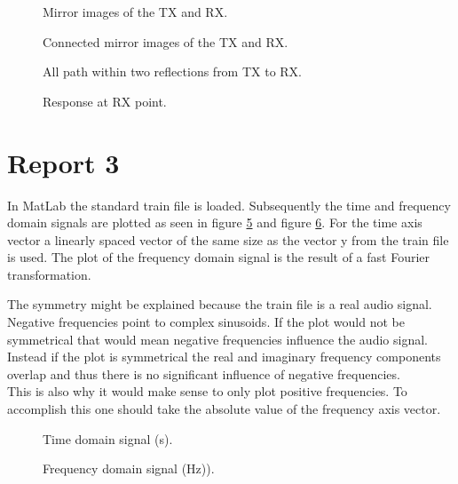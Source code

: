 \documentclass[final]{scrreprt} %
\begin{document}
\begin{figure}[H]
	\centering
	\setlength\figureheight{6cm}
    	\setlength\figurewidth{6cm}
	
	\caption{Mirror images of the TX and RX.}
	\label{fig:mirror}
\end{figure}

\begin{figure}[H]
	\centering
	\setlength\figureheight{6cm}
    	\setlength\figurewidth{6cm}
	
	\caption{Connected mirror images of the TX and RX.}
	\label{fig:connected}
\end{figure}

\begin{figure}[H]
	\centering
	\setlength\figureheight{6cm}
    	\setlength\figurewidth{6cm}
	
	\caption{All path within two reflections from TX to RX.}
	\label{fig:reflections}
\end{figure}

\begin{figure}[H]
	\centering
	\setlength\figureheight{4cm}
    	\setlength{}
	
	\caption{Response at RX point.}
	\label{fig:response}
\end{figure}

\section*{Report 3}

In MatLab the standard train file is loaded. 
Subsequently the time and frequency domain signals are plotted as seen in figure \ref{fig:train_time} and figure \ref{fig:train_freq}. 
For the time axis vector a linearly spaced vector of the same size as the vector y from the train file is used. 
The plot of the frequency domain signal is the result of a fast Fourier transformation.

The symmetry might be explained because the train file is a real audio signal. 
Negative frequencies point to complex sinusoids. 
If the plot would not be symmetrical that would mean negative frequencies influence the audio signal. 
Instead if the plot is symmetrical the real and imaginary frequency components overlap and thus there is no significant influence of negative frequencies.\\
This is also why it would make sense to only plot positive frequencies.
To accomplish this one should take the absolute value of the frequency axis vector.
\begin{figure}[H]
    \centering
	\setlength\figureheight{6cm}
    	\setlength\figurewidth{14cm}
	
	\caption{Time domain signal (s).}
	\label{fig:train_time}
\end{figure}
\begin{figure}[H]
    \centering
	\setlength\figureheight{6cm}
    	\setlength\figurewidth{14cm}
	
	\caption{Frequency domain signal (Hz)).}
	\label{fig:train_freq}
\end{figure}
\end{document}
